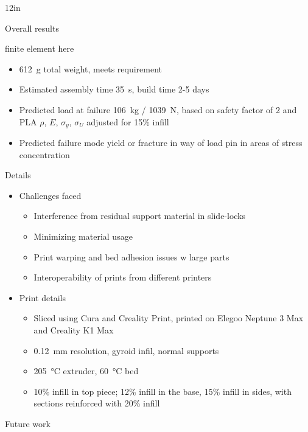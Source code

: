\documentclass[pdf]{beamer}
\begin{document}
\begin{frame}{}
\begin{columns}[T,totalwidth=\textwidth]
\begin{column}{12in}
\begin{minipage}[t][\textheight]{\linewidth}
\begin{block}{Overall results}
\begin{center}
finite element here
\end{center}
\begin{itemize}
\item \qty{612}{\gram} total weight, meets requirement
\item Estimated assembly time \qty{35}{\second}, build time 2-5 days 
\item Predicted load at failure \qty{106}{\kilo\gram} / \qty{1039}{\newton}, based on safety factor of 2 and PLA $\rho$, $E$, $\sigma_y$, $\sigma_{U}$ adjusted for 15\% infill
\item Predicted failure mode yield or fracture in way of load pin in areas of stress concentration
\end{itemize}
\end{block}
\vfill
\begin{block}{Details}
\begin{itemize}
\item Challenges faced
\begin{itemize}
\item Interference from residual support material in slide-locks
\item Minimizing material usage
\item Print warping and bed adhesion issues w large parts
\item Interoperability of prints from different printers
\end{itemize}
\item Print details
\begin{itemize}
\item Sliced using Cura and Creality Print, printed on Elegoo Neptune 3 Max and Creality K1 Max
\item \qty{0.12}{\milli\meter} resolution, gyroid infil, normal supports
\item \qty{205}{\celsius} extruder, \qty{60}{\celsius} bed
\item 10\% infill in top piece; 12\% infill in the base, 15\% infill in sides, with sections reinforced with 20\% infill
\end{itemize}
\end{itemize}
\end{block}
\vfill
\begin{block}{Future work}
\begin{itemize}

\end{itemize}
\end{block}
\end{minipage}
\end{column}
\end{columns}
\end{frame}
\end{document}
